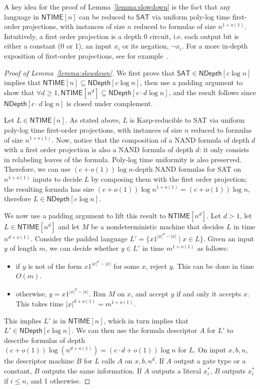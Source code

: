 \documentclass[a4paper, 11pt]{article}
\theoremstyle{plain}
\theoremstyle{definition}
\theoremstyle{remark}
\newcommand{\NTIME}{\textsf{NTIME}}%
\newcommand{\SAT}{\textsf{SAT}}%
\newcommand{\ND}{\textsf{NDepth}}%
\newcommand{\NDL}[1]{\ND[ #1 \log n]}%
\begin{document}
A key idea for the proof of Lemma~\ref{lemma:slowdown} 
is the fact that any language in $\NTIME[n]$ can
be reduced to $\SAT{}$ via uniform poly-log time first-order projections, 
with instances of size $n$ reduced to formulas of size $n^{1+o(1)}$.
Intuitively, a first order projection is a depth 0 circuit, 
i.e. each output bit is either a constant (0 or 1),
an input $x_i$ or its negation, $\neg x_i$.
For a more in-depth exposition of first-order projections,
see for example~\cite[End of Sec.~3]{allender1997first}.
\begin{proof}[Proof of Lemma~\ref{lemma:slowdown}]
	We first prove that $\SAT{}\in \NDL{c}$ implies that $\NTIME[n] \subseteq \NDL{c}$,
	then use a padding argument to show that $\forall d\ge 1, \NTIME[n^d] \subseteq \NDL{c\cdot d}$,
	and the result follows since $\NDL{c\cdot d}$ is closed under complement.

	Let $L\in\NTIME[n]$. 
	As stated above, $L$ is Karp-reducible to \SAT{} via
	uniform poly-log time first-order projections, 
	with instances of size $n$ reduced to formulas of size $n^{1+o(1)}$.
	Now, notice that the composition of a NAND formula of depth $d$ with a first order projection
	is also a NAND formula of depth $d$: it only consists in relabeling leaves of the formula.
	Poly-log time uniformity is also preserved. 
	Therefore, we can use $(c+o(1)) \log n$-depth NAND formulas for \SAT{} on $n^{1+o(1)}$
	inputs to decide $L$ by composing them with the first order projection; 
	the resulting formula has size $(c+o(1)) \log n^{1+o(1)} = (c+o(1)) \log n$,
	therefore $L\in\NDL{c}$.

	We now use a padding argument to lift this result to $\NTIME[n^d]$.
	Let $d>1$, let $L\in \NTIME[n^d]$ and let $M$ be a nondeterministic machine that decides $L$
	in time $n^{d+o(1)}$.
	Consider the padded language $L' = \{x1^{|x|^d - |x|} \mid x\in L\}$.
	Given an input $y$ of length $m$, we can decide whether $y\in L'$ in time 
	$m^{1+o(1)}$ as follows:
	\begin{itemize}
		\item if $y$ is not of the form $x1^{|x|^d - |x|}$ for some $x$, reject $y$.
		This can be done in time $O(m)$.
		\item otherwise, $y = x1^{|x|^d - |x|}$. Run $M$ on $x$, and accept $y$ 
		if and only it accepts $x$. This takes time $|x|^{d+o(1)} = m^{1+o(1)}$.
	\end{itemize}
	This implies $L'$ is in $\NTIME[n]$, which in turn implies that $L'\in\NDL{c}$.
	We can then use the formula descriptor $A$ for $L'$ 
	to describe formulas of depth $(c + o(1))\log \left(n^{d+o(1)}\right) = (c\cdot d + o(1))\log n$ for $L$.
	On input $x,b,n$, the descriptor machine $B$ for $L$  
	calls $A$ on $x, b, n^d$.
	If $A$ output a gate type or a constant, $B$ outputs the same information.
	If $A$ outputs a literal $x_i^*$, $B$ outputs $x_i^*$ if $i \le n$, and 1 otherwise.
\end{proof}
\end{document}
